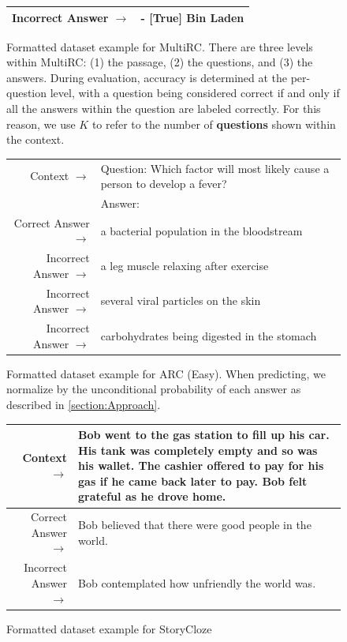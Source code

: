 \begin{figure}
{\begin{tabularx}{\linewidth}{r X}
 Incorrect Answer $\to$ & - [True] Bin Laden\\ \bottomrule \end{tabularx} }  \caption{Formatted dataset example for MultiRC. There are three levels within MultiRC: (1) the passage, (2) the questions, and (3) the answers. During evaluation, accuracy is determined at the per-question level, with a question being considered correct if and only if all the answers within the question are labeled correctly. For this reason, we use $K$ to refer to the number of \textbf{questions} shown within the context.   }  \label{eval:MultiRC}  \end{figure}%
\begin{figure} { \tt \footnotesize \begin{tabularx}{\linewidth}{r X} \toprule Context $\to$ & Question: Which factor will most likely cause a person to develop a fever? \\ 
 & Answer: \\ 
 \midrule Correct Answer $\to$ & a bacterial population in the bloodstream \\ 
 Incorrect Answer $\to$ & a leg muscle relaxing after exercise \\ 
 Incorrect Answer $\to$ & several viral particles on the skin \\ 
 Incorrect Answer $\to$ & carbohydrates being digested in the stomach\\ \bottomrule \end{tabularx} }

 \caption{Formatted dataset example for ARC (Easy). When predicting, we normalize by the unconditional probability of each answer as described in \ref{section:Approach}.}  \label{eval:ARC (Easy)}  \end{figure}%
\clearpage
\begin{figure} { \tt \footnotesize \begin{tabularx}{\linewidth}{r X} \toprule Context $\to$ & Bob went to the gas station to fill up his car. His tank was completely empty and so was his wallet. The cashier offered to pay for his gas if he came back later to pay. Bob felt grateful as he drove home. \\
 \midrule Correct Answer $\to$ & Bob believed that there were good people in the world. \\ 
 Incorrect Answer $\to$ & Bob contemplated how unfriendly the world was.\\ \bottomrule \end{tabularx} }  \caption{Formatted dataset example for StoryCloze}  \label{eval:StoryCloze}  \end{figure}%
